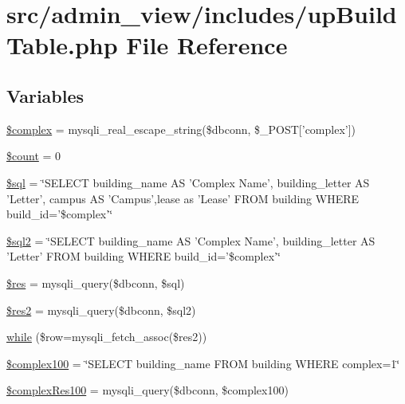 \hypertarget{upBuildTable_8php}{\section{src/admin\-\_\-view/includes/up\-Build\-Table.php \-File \-Reference}
\label{upBuildTable_8php}
}
\subsection*{\-Variables}
\begin{DoxyCompactItemize}
\item 
\hyperlink{upBuildTable_8php_a25ec02534214977602829622b78b5d78}{\$complex} = mysqli\-\_\-real\-\_\-escape\-\_\-string(\$dbconn, \$\-\_\-\-P\-O\-S\-T\mbox{[}'complex'\mbox{]})
\item 
\hyperlink{upBuildTable_8php_af789423037bbc89dc7c850e761177570}{\$count} = 0
\item 
\hyperlink{upBuildTable_8php_a047170d6020a882807665812a27e2525}{\$sql} = \char`\"{}\-S\-E\-L\-E\-C\-T building\-\_\-name \-A\-S '\-Complex \-Name', building\-\_\-letter \-A\-S '\-Letter', campus \-A\-S '\-Campus',lease as '\-Lease' \-F\-R\-O\-M building \-W\-H\-E\-R\-E build\-\_\-id='\$complex'\char`\"{}
\item 
\hyperlink{upBuildTable_8php_a1ad0ffe3fa0755e56a1a6bb40c232b8a}{\$sql2} = \char`\"{}\-S\-E\-L\-E\-C\-T building\-\_\-name \-A\-S '\-Complex \-Name', building\-\_\-letter \-A\-S '\-Letter' \-F\-R\-O\-M building \-W\-H\-E\-R\-E build\-\_\-id='\$complex'\char`\"{}
\item 
\hyperlink{upBuildTable_8php_a49a8a4009b02e49717caa88b128affc5}{\$res} = mysqli\-\_\-query(\$dbconn, \$sql)
\item 
\hyperlink{upBuildTable_8php_a3977504adc01ced790e56cece5e24b60}{\$res2} = mysqli\-\_\-query(\$dbconn, \$sql2)
\item 
\hyperlink{upBuildTable_8php_ac3862ddd2ba0a132de05b14eab1a8e7d}{while} (\$row=mysqli\-\_\-fetch\-\_\-assoc(\$res2))
\item 
\hyperlink{upBuildTable_8php_a649817e46b95fbef9ea44e119999dada}{\$complex100} = \char`\"{}\-S\-E\-L\-E\-C\-T building\-\_\-name \-F\-R\-O\-M building \-W\-H\-E\-R\-E complex=1\char`\"{}
\item 
\hyperlink{upBuildTable_8php_aa5d9e7c76b4a1d987e4877d6115c0a38}{\$complex\-Res100} = mysqli\-\_\-query(\$dbconn, \$complex100)
\end{DoxyCompactItemize}


